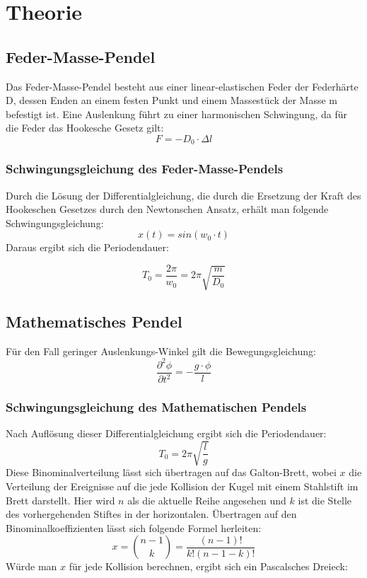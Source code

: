 \section{Theorie}
\subsection{Feder-Masse-Pendel}
Das Feder-Masse-Pendel besteht aus einer linear-elastischen Feder der Federhärte D, dessen Enden an einem festen Punkt und einem Massestück der Masse m befestigt ist.
Eine Auslenkung führt zu einer harmonischen Schwingung, da für die Feder das Hookesche Gesetz gilt:
\begin{equation}
F = -D_{0} \cdot \Delta l 
\end{equation}
\subsubsection{Schwingungsgleichung des Feder-Masse-Pendels}
Durch die Lösung der Differentialgleichung, die durch die Ersetzung der Kraft des Hookeschen Gesetzes durch den Newtonschen Ansatz, erhält man folgende Schwingungsgleichung:
\begin{equation}
        x(t) = sin(w_{0}\cdot t)
\end{equation}
Daraus ergibt sich die Periodendauer:

\begin{equation}
    T_{0} = \frac{2\pi}{w_{0}} = 2\pi \sqrt{\frac{m}{D_{0}}}
\end{equation}
\subsection{Mathematisches Pendel}
Für den Fall geringer Auslenkungs-Winkel gilt die Bewegungsgleichung:
\begin{equation}
	\frac{\partial ^2 \phi}{\partial t^2} = -\frac{g\cdot \phi}{l}
\end{equation}
\subsubsection{Schwingungsgleichung des Mathematischen Pendels}
Nach Auflösung dieser Differentialgleichung ergibt sich die Periodendauer:
\begin{equation}
T_{0} = 2\pi \sqrt{\frac{l}{g}}
\end{equation}
\iffalse
Diese Binominalverteilung lässt sich übertragen auf das Galton-Brett, wobei $x$ die Verteilung der Ereignisse auf die jede Kollision der Kugel mit einem Stahlstift im Brett darstellt. Hier wird $n$ als die aktuelle Reihe angesehen und $k$ ist die Stelle des vorhergehenden Stiftes in der horizontalen. Übertragen auf den Binominalkoeffizienten lässt sich folgende Formel herleiten:
\begin{equation}
    x=\binom{n-1}{k}=\frac{(n-1)!}{k!(n-1-k)!}
\end{equation}
Würde man $x$ für jede Kollision berechnen, ergibt sich ein Pascalsches Dreieck:

